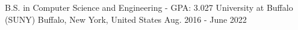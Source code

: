 

\begin{cventries}

  \cventry
    {B.S. in Computer Science and Engineering - GPA: 3.027} %
    {University at Buffalo (SUNY)} %
    {Buffalo, New York, United States} %
    {Aug. 2016 - June 2022} %
    {
    }
    

\end{cventries}